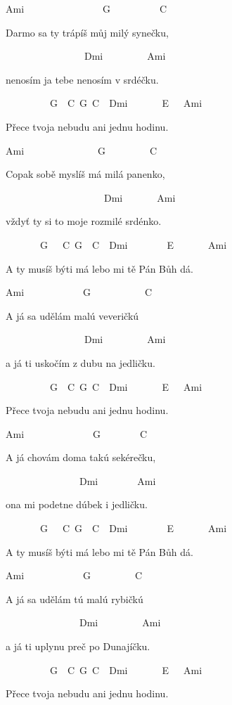 
Ami~~~~~~~~~~~~~~~~G~~~~~~~~~~C~~~~~

Darmo sa ty trápíš můj milý synečku,

~~~~~~~~~~~~~~~~Dmi~~~~~~~~~Ami~~~

nenosím ja tebe nenosím v srdéčku.

~~~~~~~~~G~~C~G~C~~Dmi~~~~~~~E~~~Ami

Přece tvoja nebudu ani jednu hodinu.

\bigskip

Ami~~~~~~~~~~~~~~~G~~~~~~~~~C~~~~~

Copak sobě myslíš má milá panenko,

~~~~~~~~~~~~~~~~~~~~Dmi~~~~~~~Ami~~~

vždyť ty si to moje rozmilé srdénko.

~~~~~~~G~~~C~G~~C~~Dmi~~~~~~~~E~~~~~~~Ami

A ty musíš býti má lebo mi tě Pán Bůh dá.

\bigskip

Ami~~~~~~~~~~~~G~~~~~~~~~~~C~

A já sa udělám malú veveričkú

~~~~~~~~~~~~~~~~Dmi~~~~~~~~~Ami~~~~

a já ti uskočím z dubu na jedličku.

~~~~~~~~~G~~C~G~C~~Dmi~~~~~~~E~~~Ami

Přece tvoja nebudu ani jednu hodinu.

\bigskip

Ami~~~~~~~~~~~~~~G~~~~~~~~C~~~~~

A já chovám doma takú sekérečku,

~~~~~~~~~~~~~~~Dmi~~~~~~~~Ami~~~

ona mi podetne dúbek i jedličku.

~~~~~~~G~~~C~G~~C~~Dmi~~~~~~~~E~~~~~~~Ami

A ty musíš býti má lebo mi tě Pán Bůh dá.

\bigskip

Ami~~~~~~~~~~~~G~~~~~~~~~C~~~~

A já sa udělám tú malú rybičkú

~~~~~~~~~~~~~~~Dmi~~~~~~~~~Ami~~~

a já ti uplynu preč po Dunajíčku.

~~~~~~~~~G~~C~G~C~~Dmi~~~~~~~E~~~Ami

Přece tvoja nebudu ani jednu hodinu.

\bigskip

